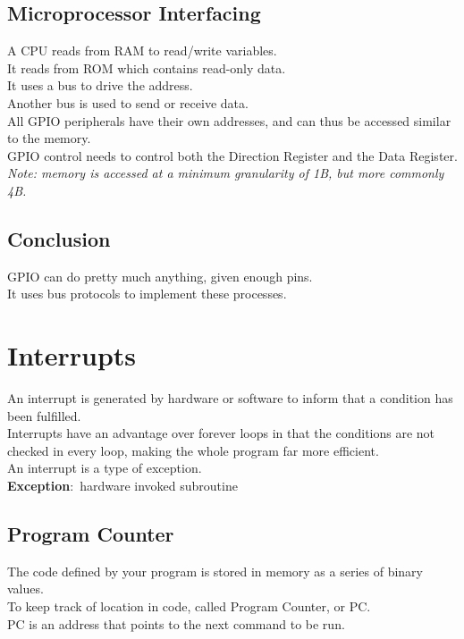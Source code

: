 \documentclass[nobib]{tufte-handout}
\newcommand{\defn}[2]{\noindent\textbf{#1}:\ #2}
\begin{document}
\subsection{Microprocessor Interfacing}
A CPU reads from RAM to read/write variables.\\
It reads from ROM which contains read-only data.\\
It uses a bus to drive the address.\\
Another bus is used to send or receive data.\\
All GPIO peripherals have their own addresses, and can thus be accessed similar to the memory.\\
GPIO control needs to control both the Direction Register and the Data Register.\\
\textit{Note: memory is accessed at a minimum granularity of 1B, but more commonly 4B.}\\
\subsection{Conclusion}
GPIO can do pretty much anything, given enough pins.\\
It uses bus protocols to implement these processes.\\
\section{Interrupts}
An interrupt is generated by hardware or software to inform that a condition has been fulfilled.\\
Interrupts have an advantage over forever loops in that the conditions are not checked in every loop, making the whole program far more efficient.\\
An interrupt is a type of exception.\\
\defn{Exception}{hardware invoked subroutine}\\
\subsection{Program Counter}
The code defined by your program is stored in memory as a series of binary values.\\
To keep track of location in code, called Program Counter, or PC.\\
PC is an address that points to the next command to be run.\\
\end{document}
